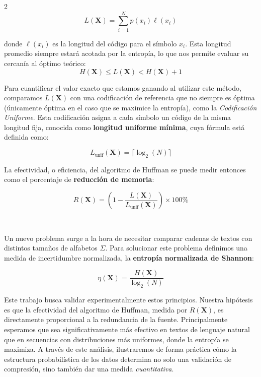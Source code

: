 \documentclass[a4paper, 10pt]{article}
\begin{document}
\begin{multicols}{2}
    \begin{equation}
        L(\mathbf{X}) = \sum_{i=1}^{N} p(x_i)\ell(x_i)
        \label{eq:avg_length}
    \end{equation}

    donde $\ell(x_i)$ es la longitud del código para el símbolo $x_i$. Esta longitud promedio siempre estará acotada por la entropía, lo que nos permite evaluar su cercanía al óptimo teórico:
    \begin{equation}
        H(\mathbf{X}) \leq L(\mathbf{X}) < H(\mathbf{X}) + 1
        \label{eq:avg_length_bound}
    \end{equation}

    Para cuantificar el valor exacto que estamos ganando al utilizar este método, comparamos $L(\mathbf{X})$ con una codificación de referencia que no siempre es óptima (únicamente óptima en el caso que se maximice la entropía), como la \textit{Codificación Uniforme}. Esta codificación asigna a cada símbolo un código de la misma longitud fija, conocida como \textbf{longitud uniforme mínima}, cuya fórmula está definida como:

    \begin{equation}
        L_{\text{unif}}(\mathbf{X}) = \lceil \log_2 (N) \rceil
        \label{eq:unif}
    \end{equation}

    La efectividad, o eficiencia, del algoritmo de Huffman se puede medir entonces como el porcentaje de \textbf{reducción de memoria}:

    \begin{equation}
        R(\mathbf{X}) = \left(1 - \frac{L(\mathbf{X})}{L_{\text{unif}}(\mathbf{X})}\right) \times 100\%
        \label{eq:reduction}
    \end{equation}

    \

    Un nuevo problema surge a la hora de necesitar comparar cadenas de textos con distintos tamaños de alfabetos $\Sigma$. Para solucionar este problema definimos una medida de incertidumbre normalizada, la \textbf{entropía normalizada de Shannon}:

    \begin{equation}
        \eta(\mathbf{X}) = \frac{H(\mathbf{X})}{\log_2(N)}
        \label{eq:norm_entropy}
    \end{equation}

    Este trabajo busca validar experimentalmente estos principios. Nuestra hipótesis es que la efectividad del algoritmo de Huffman, medida por $R(\mathbf{X})$, es directamente proporcional a la redundancia de la fuente. Principalmente esperamos que sea significativamente más efectivo en textos de lenguaje natural que en secuencias con distribuciones más uniformes, donde la entropía se maximiza. A través de este análisis, ilustraremos de forma práctica cómo la estructura probabilística de los datos determina no solo una validación de compresión, sino también dar una medida \textit{cuantitativa}.

    \end{multicols}
\end{document}
